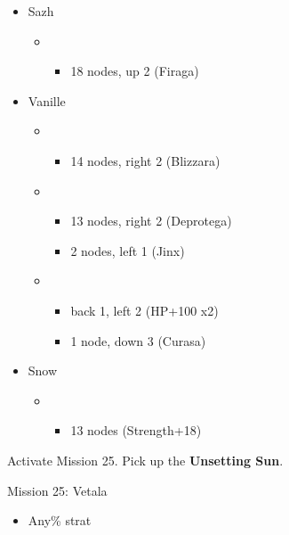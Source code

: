 \begin{menu}
	\begin{itemize}
		\crystarium
		\begin{itemize}
			\item Sazh
				\begin{itemize}
					\item \rav
						\begin{itemize}
							\item 18 nodes, up 2 (Firaga)
						\end{itemize}
				\end{itemize}
			\item Vanille
				\begin{itemize}
					\item \rav
						\begin{itemize}
							\item 14 nodes, right 2 (Blizzara)
						\end{itemize}
					\item \sab
						\begin{itemize}
							\item 13 nodes, right 2 (Deprotega)
							\item 2 nodes, left 1 (Jinx)
						\end{itemize}
					\item \med
						\begin{itemize}
							\item back 1, left 2 (HP+100 x2)
							\item 1 node, down 3 (Curasa)
						\end{itemize}
				\end{itemize}
			\item Snow
				\begin{itemize}
					\item \sen
						\begin{itemize}
							\item 13 nodes (Strength+18)
						\end{itemize}
				\end{itemize}							      	
		\end{itemize}
	\end{itemize}
\end{menu}

Activate Mission 25.
Pick up the \textbf{Unsetting Sun}.

\begin{battle}{Mission 25: Vetala}
	\begin{itemize}
		\item Any\% strat
	\end{itemize}
\end{battle}

